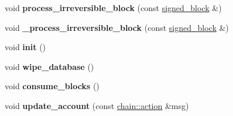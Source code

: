 \begin{DoxyCompactItemize}
void {\bfseries process\+\_\+irreversible\+\_\+block} (const \mbox{\hyperlink{structaacio_1_1chain_1_1signed__block}{signed\+\_\+block}} \&)
\item 
\mbox{\label{classaacio_1_1mongo__db__plugin__impl_adec93cd5312c66b07603d5080cb1f011}} 
void {\bfseries \+\_\+process\+\_\+irreversible\+\_\+block} (const \mbox{\hyperlink{structaacio_1_1chain_1_1signed__block}{signed\+\_\+block}} \&)
\item 
\mbox{\label{classaacio_1_1mongo__db__plugin__impl_acb6c23f27d420bdaf76ed713236a7af9}} 
void {\bfseries init} ()
\item 
\mbox{\label{classaacio_1_1mongo__db__plugin__impl_ac8e02715497cba957c7a1c313826da80}} 
void {\bfseries wipe\+\_\+database} ()
\item 
\mbox{\label{classaacio_1_1mongo__db__plugin__impl_aef112047c8e5d5acc9aa9005e05a82a7}} 
void {\bfseries consume\+\_\+blocks} ()
\item 
\mbox{\label{classaacio_1_1mongo__db__plugin__impl_a91f72ee89efef0f807968080f9ef6008}} 
void {\bfseries update\+\_\+account} (const \mbox{\hyperlink{structaacio_1_1chain_1_1action}{chain\+::action}} \&msg)
\end{DoxyCompactItemize}

